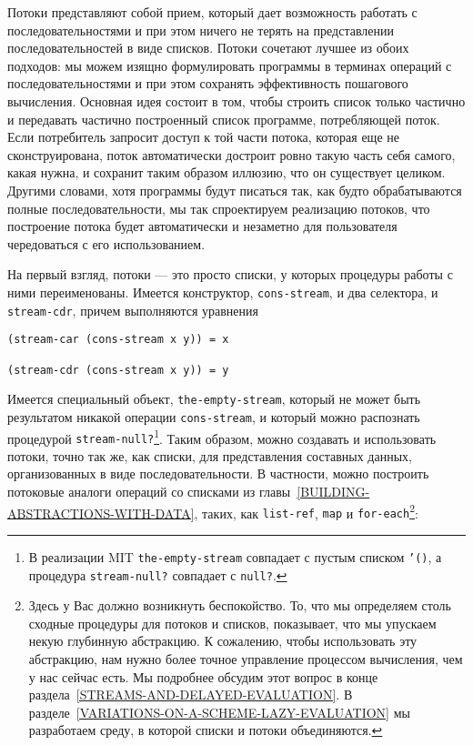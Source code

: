Потоки представляют собой прием, который дает возможность
работать с последовательностями и при этом ничего не терять на
представлении последовательностей в виде списков.  Потоки
сочетают лучшее из обоих подходов: мы можем изящно формулировать
программы в терминах операций с последовательностями и при этом
сохранять эффективность пошагового вычисления.  Основная идея состоит
в том, чтобы строить список только частично и передавать частично
построенный список программе, потребляющей поток.  Если потребитель
запросит доступ к той части потока, которая еще не сконструирована,
поток автоматически достроит ровно такую часть себя самого, какая
нужна, и сохранит таким образом иллюзию, что он существует
целиком.  Другими словами, хотя программы будут писаться так, как
будто обрабатываются полные последовательности, мы так спроектируем
реализацию потоков, что построение потока будет автоматически и
незаметно для пользователя чередоваться с его использованием.

На первый взгляд, потоки --- это просто списки, у которых
процедуры работы с ними переименованы.  Имеется конструктор,
{\tt cons-stream},
и два селектора,   и  
{\tt stream-cdr}, причем выполняются уравнения

\begin{Verbatim}[fontsize=\small]
(stream-car (cons-stream x y)) = x

(stream-cdr (cons-stream x y)) = y
\end{Verbatim}

Имеется специальный объект,
%
%
%
{\tt the-empty-stream}, который не
может быть результатом никакой операции {\tt cons-stream}, и
который можно распознать процедурой 
{\tt stream-null?}\footnote{
  В реализации MIT
  {\tt the-empty-stream}
совпадает с пустым списком {\tt '()}, а  процедура
{\tt stream-null?} совпадает с {\tt null?}.}.
Таким образом, можно создавать и использовать потоки, точно так же, как списки,
для представления составных данных, организованных в виде
последовательности.  В частности, можно построить потоковые аналоги
операций со списками из
главы~\ref{BUILDING-ABSTRACTIONS-WITH-DATA}, таких, как
{\tt list-ref}, {\tt map} и
{\tt for-each}\footnote{Здесь у Вас должно возникнуть беспокойство.  То, что мы
определяем столь сходные процедуры для потоков и списков, показывает,
что мы упускаем некую глубинную абстракцию.  К сожалению, чтобы
использовать эту абстракцию, нам нужно более точное управление
процессом вычисления, чем у нас сейчас есть.  Мы подробнее обсудим
этот вопрос в конце
раздела~\ref{STREAMS-AND-DELAYED-EVALUATION}.  В
разделе~\ref{VARIATIONS-ON-A-SCHEME-LAZY-EVALUATION} мы
разработаем среду, в которой списки и потоки объединяются.}:

